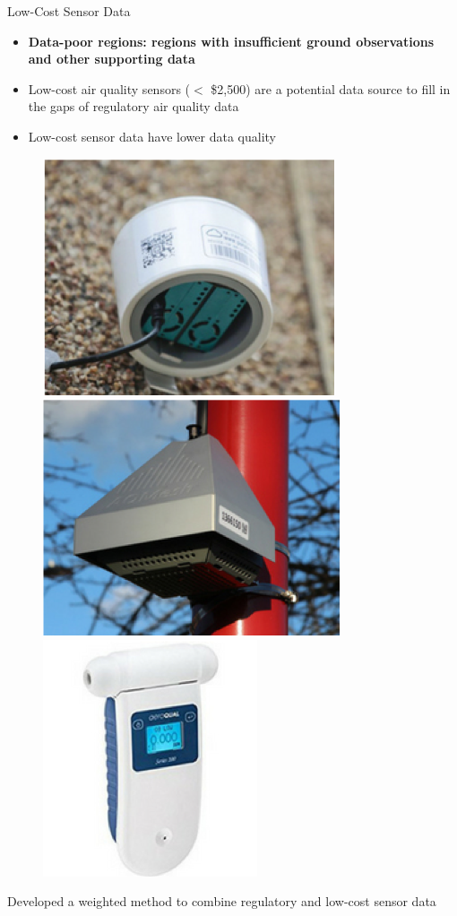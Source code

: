 \begin{frame}{Low-Cost Sensor Data}
    \begin{itemize}
        \item \textbf{Data-poor regions: regions with insufficient ground observations and other supporting data}
        \item Low-cost air quality sensors ($<$ \$2,500) are a potential data source to fill in the gaps of regulatory air quality data  
        \item Low-cost sensor data have lower data quality
    \end{itemize}
    \begin{figure}
        \centering
        \includegraphics[height=0.25\textwidth]{img/sensor1.png} \hspace{5px}
        \includegraphics[height=0.25\textwidth]{img/sensor2.png} \hspace{5px}
        \includegraphics[height=0.25\textwidth]{img/sensor3.png}
    \end{figure}
    \begin{center}
        \color{red} Developed a weighted method to combine regulatory and low-cost sensor data
    \end{center}
\end{frame}